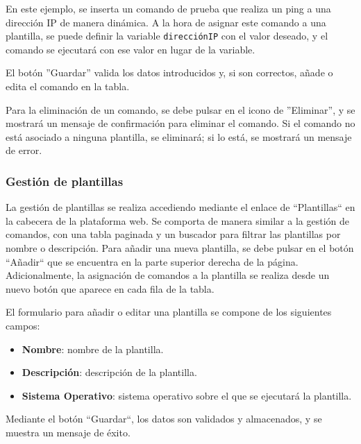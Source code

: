
En este ejemplo, se inserta un comando de prueba que realiza un ping a una dirección IP de manera dinámica.
A la hora de asignar este comando a una plantilla, se puede definir la variable \texttt{direcciónIP} con el valor
deseado, y el comando se ejecutará con ese valor en lugar de la variable.

El botón ''Guardar'' valida los datos introducidos y, si son correctos, añade o edita el comando en la tabla.

Para la eliminación de un comando, se debe pulsar en el icono de ''Eliminar'', y se mostrará un mensaje de
confirmación para eliminar el comando.
Si el comando no está asociado a ninguna plantilla, se eliminará; si lo está, se mostrará un mensaje de error.

\subsubsection{Gestión de plantillas}

La gestión de plantillas se realiza accediendo mediante el enlace de ``Plantillas`` en la cabecera de la plataforma web.
Se comporta de manera similar a la gestión de comandos, con una tabla paginada y un buscador para filtrar las plantillas por
nombre o descripción.
Para añadir una nueva plantilla, se debe pulsar en el botón ``Añadir`` que se encuentra en la parte superior derecha de la
página.
Adicionalmente, la asignación de comandos a la plantilla se realiza desde un nuevo botón que aparece en cada fila
de la tabla.


El formulario para añadir o editar una plantilla se compone de los siguientes campos:

\begin{itemize}
    \item \textbf{Nombre}: nombre de la plantilla.
    \item \textbf{Descripción}: descripción de la plantilla.
    \item \textbf{Sistema Operativo}: sistema operativo sobre el que se ejecutará la plantilla.
\end{itemize}


Mediante el botón ``Guardar``, los datos son validados y almacenados, y se muestra un mensaje de éxito.

